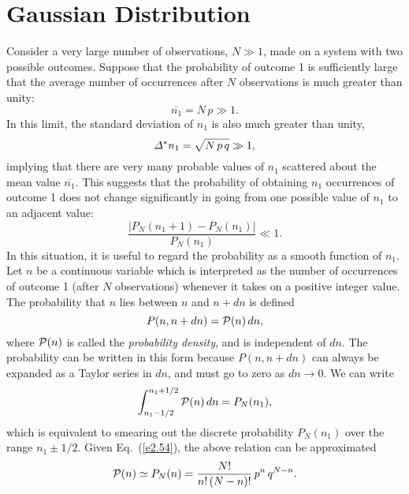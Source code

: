 \section{Gaussian Distribution}
Consider a very large number of observations, $N\gg 1$, made on a system
with  two possible outcomes.
 Suppose that the probability of outcome 1 is sufficiently large that
the average number of occurrences  after $N$
observations is much greater than unity:
\begin{equation}
\overline{n_1} = N\,p \gg 1.
\end{equation}
In this limit, the standard deviation of $n_1$ is also much greater than unity,
\begin{equation}
{\mit\Delta}^\ast n_1 = \sqrt{N\,p\,q}\gg 1,
\end{equation}
implying that there are very many probable values of $n_1$ scattered about the
mean value $\overline{n_1}$. 
This suggests that the probability of obtaining $n_1$ occurrences
of outcome 1
 does not change significantly in going  from one possible value of
$n_1$ to an adjacent value:
\begin{equation}
\frac{|P_N(n_1+1)-P_N(n_1)|}{P_N(n_1)} \ll 1.\label{e2.54}
\end{equation}
In this situation, it is useful to regard the probability as a smooth
function of $n_1$. Let $n$ be a continuous variable which is
interpreted as  the number of occurrences of outcome 1 (after $N$
observations) whenever it takes
on a positive integer value. The probability that $n$ lies between
$n$ and $n+dn$ is defined 
\begin{equation}
P(n, n+dn) = {\cal P}(n)\, dn,
\end{equation}
where ${\cal P}(n)$ is called the {\em probability density}, and is independent
of $dn$. The probability can be written in this form because
$P(n, n+dn)$ can always be expanded as a Taylor series in $dn$, and must go
to zero as $dn\rightarrow 0$.
We can write
\begin{equation}
\int_{n_1-1/2}^{n_1+1/2} {\cal P}(n)\, dn = P_N(n_1),
\end{equation}
which is equivalent to smearing out the discrete probability $P_N(n_1)$ 
over the range $n_1\pm 1/2$. Given Eq.~(\ref{e2.54}),  the above relation
can be approximated 
\begin{equation}
{\cal P}(n) \simeq P_N(n) = \frac{N!}{n!\,(N-n)!}\,p^n\,q^{N-n}.\label{e2.57}
\end{equation}

